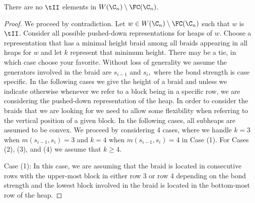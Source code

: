 \begin{theorem}\label{thm:TavoidC}
There are no $\tII$ elements in $W(\C_n)\setminus \FC(\C_n)$. 	
\begin{proof}
	We proceed by contradiction. Let $w \in W(\C_n)\setminus\FC(\C_n)$ such that $w$ is $\tII$. Consider all possible pushed-down representations for heaps of $w$. Choose a representation  that has a minimal height braid among all braids appearing in all heaps for $w$ and let $k$ represent that minimum height. There may be a tie, in which case choose your favorite. Without loss of generality we assume the generators involved in the braid are $s_{i-1}$ and $s_{i},$ where the bond strength is case specific. In the following cases we give the height of a braid and unless we indicate otherwise whenever we refer to a block being in a specific row, we are considering the pushed-down representation of the heap. In order to consider the braids that we are looking for we need to allow some flexibility when referring to the vertical position of a given block. In the following cases, all subheaps are assumed to be convex. We proceed by considering 4 cases, where we handle $k=3$ when $m(s_{i-1},s_i)=3$ and $k=4$ when $m(s_{i-1},s_i)=4$ in Case (1). For Cases (2), (3), and (4) we assume that $k \geq 4$.
	
	Case (1): In this case, we are assuming that the braid is located in consecutive rows with the upper-most block in either row 3 or row 4 depending on the bond strength and the lowest block involved in the braid is located in the bottom-most row of the heap.
	

\end{proof}
\end{theorem}
